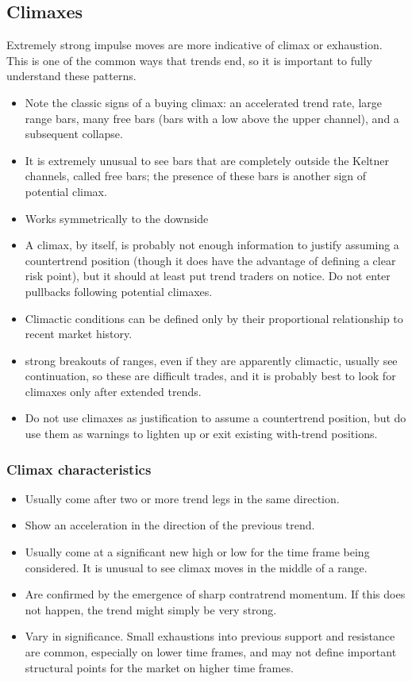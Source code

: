 \documentclass{../notes}
\begin{document}
\subsection{Climaxes}
Extremely strong impulse moves are more indicative of climax or exhaustion. This is one of the common ways that trends end, so it is important to fully understand these patterns.
\begin{itemize}
  \item Note the classic signs of a buying climax: an accelerated trend rate, large range bars, many free bars (bars with a low above the upper channel), and a subsequent collapse.
  \item It is extremely unusual to see bars that are completely outside the Keltner channels, called free bars; the presence of these bars is another sign of potential climax.
  \item Works symmetrically to the downside
  \item A climax, by itself, is probably not enough information to justify assuming a countertrend position (though it does have the advantage of defining a clear risk point), but it should at least put trend traders on notice. Do not enter pullbacks following potential climaxes.
  \item Climactic conditions can be defined only by their proportional relationship to recent market history.
  \item strong breakouts of ranges, even if they are apparently climactic, usually see continuation, so these are difficult trades, and it is probably best to look for climaxes only after extended trends.
  \item Do not use climaxes as justification to assume a countertrend position, but do use them as warnings to lighten up or exit existing with-trend positions.
\end{itemize}
\subsubsection{Climax characteristics}
\begin{itemize}
  \item Usually come after two or more trend legs in the same direction.
  \item Show an acceleration in the direction of the previous trend.
  \item Usually come at a significant new high or low for the time frame being considered. It is unusual to see climax moves in the middle of a range.
  \item Are confirmed by the emergence of sharp contratrend momentum. If this does not happen, the trend might simply be very strong.
  \item Vary in significance. Small exhaustions into previous support and resistance are common, especially on lower time frames, and may not define important structural points for the market on higher time frames.
\end{itemize}
\end{document}

